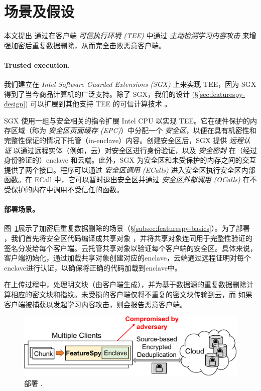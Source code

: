\section{场景及假设}
\label{sec:featurespy-setting}
本文提出 \sysnameF 通过在客户端 {\em 可信执行环境 (TEE)} 中通过 {\em 主动检测学习内容攻击} 来增强加密后重复数据删除，从而完全击败恶意客户端。

\paragraph*{Trusted execution.} 我们建立在 {\em Intel Software Guarded Extensions (SGX)} \cite{sgx} 上来实现 TEE，因为 SGX 得到了当今商品计算机的广泛支持。除了 SGX，我们的设计 (\S\ref{sec:featurespy-design}) 可以扩展到其他支持 TEE 的可信计算技术 \cite{amd-sev, pinto19}。

SGX 使用一组与安全相关的指令扩展 Intel CPU 以实现 TEE。它在硬件保护的内存区域（称为 {\em 安全区页面缓存 (EPC)}）中分配一个 {\em 安全区}，以便在具有机密性和完整性保证的情况下托管（in-enclave）内容。创建安全区后，SGX 提供 {\em 远程认证} 以通过远程实体（例如，云）对安全区进行身份验证，以及 {\em 安全密封} 在（经过身份验证的）enclave 和云端。此外，SGX 为安全区和未受保护的内存之间的交互提供了两个接口。程序可以通过 {\em 安全区调用 (ECalls)} 进入安全区执行安全区内部函数。在 ECall 中，它可以暂时退出安全区并通过 {\em 安全区外部调用 (OCalls)} 在不受保护的内存中调用不受信任的函数。



\paragraph*{部署场景。}图~\ref{fig:featurespy-model}展示了加密后重复数据删除的场景（\S\ref{subsec:featurespy-basics}）。为了部署 \sysnameF，我们首先将安全区代码编译成共享对象 \cite{sgx}，并将共享对象连同用于完整性验证的签名分发给每个客户端。云托管共享对象以验证每个客户端的安全区。具体来说，客户端初始化\sysnameF，通过加载共享对象创建对应的enclave，云端通过远程证明\cite{sgx}对每个enclave进行认证，以确保将正确的代码加载到enclave中。

在上传过程中，\sysnameF 处理明文块（由客户端生成），并为基于数据源的重复数据删除计算相应的密文块和指纹。未受损的客户端仅将不重复的密文块传输到云，而 \sysnameF 如果客户端被捕获以发起学习内容攻击，则会报告恶意客户端。

\begin{figure}
  \centering
  \includegraphics[width=\textwidth]{pic/featurespy/deployment.pdf}
  \vspace{-6pt}
  \caption{部署 \sysnameF.}
  \label{fig:featurespy-model}
  \vspace{-6pt}
\end{figure}

